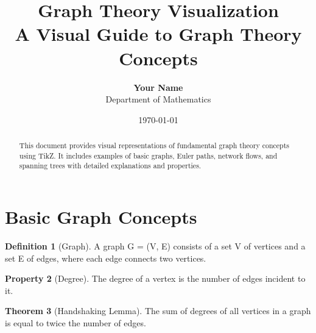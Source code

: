 \documentclass[12pt,a4paper]{article}
\title{\Large\textbf{Graph Theory Visualization}\\[0.5em]
       \normalsize A Visual Guide to Graph Theory Concepts}
\author{\textbf{Your Name}\\
        Department of Mathematics}
\date{\today}
\theoremstyle{definition}
\newtheorem{definition}{Definition}[section]
\newtheorem{theorem}[definition]{Theorem}
\newtheorem{property}[definition]{Property}
\begin{document}
\maketitle

\begin{tcolorbox}[theorembox]
\begin{abstract}
This document provides visual representations of fundamental graph theory concepts using TikZ. It includes examples of basic graphs, Euler paths, network flows, and spanning trees with detailed explanations and properties.
\end{abstract}
\end{tcolorbox}

\tableofcontents
\newpage

\section{Basic Graph Concepts}

\begin{definition}[Graph]
A graph G = (V, E) consists of a set V of vertices and a set E of edges, where each edge connects two vertices.
\end{definition}

\begin{property}[Degree]
The degree of a vertex is the number of edges incident to it.
\end{property}

\begin{center}
\end{center}

\begin{theorem}[Handshaking Lemma]
The sum of degrees of all vertices in a graph is equal to twice the number of edges.
\end{theorem}
\end{document}
